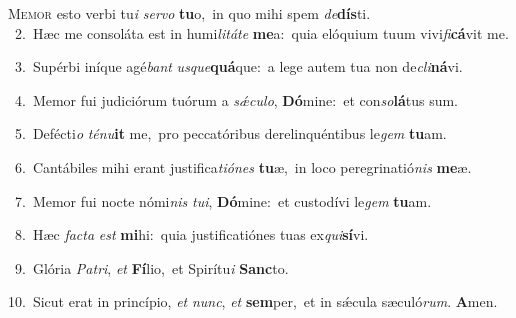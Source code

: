 \lettrine{\initial\textcolor{\initialcolor}{M}}{emor} esto verbi tu\textit{i} \textit{ser}\-\textit{vo} \textbf{tu}\-o,~\star in quo mihi spem \textit{de}\-\textbf{dís}ti.\\
{\numbfont\textcolor{\numbcolor}{~2.}}~Hæc me consoláta est in humi\-\textit{li}\-\textit{tá}\textit{te} \textbf{me}\-a:~\star quia elóquium tuum vivi\-\textit{fi}\-\textbf{cá}vit me.\par
{\numbfont\textcolor{\numbcolor}{~3.}}~Supérbi iníque agé\textit{bant} \textit{us}\-\textit{que}\textbf{quá}que:~\star a lege autem tua non de\-\textit{cli}\-\textbf{ná}vi.\par
{\numbfont\textcolor{\numbcolor}{~4.}}~Memor fui judiciórum tuórum a \textit{sǽ}\-\textit{cu}\textit{lo}, \textbf{Dó}\-mine:~\star et con\-\textit{so}\-\textbf{lá}tus sum.\par
{\numbfont\textcolor{\numbcolor}{~5.}}~Defécti\textit{o} \textit{té}\-\textit{nu}\textbf{it} me,~\star pro peccatóribus derelinquéntibus le\textit{gem} \textbf{tu}\-am.\par
{\numbfont\textcolor{\numbcolor}{~6.}}~Cantábiles mihi erant justifica\-\textit{ti}\-\textit{ó}\textit{nes} \textbf{tu}\-æ,~\star in loco peregrinatió\textit{nis} \textbf{me}\-æ.\par
{\numbfont\textcolor{\numbcolor}{~7.}}~Memor fui nocte nómi\textit{nis} \textit{tu}\-\textit{i}, \textbf{Dó}\-mine:~\star et custodívi le\textit{gem} \textbf{tu}\-am.\par
{\numbfont\textcolor{\numbcolor}{~8.}}~Hæc \textit{fac}\-\textit{ta} \textit{est} \textbf{mi}\-hi:~\star quia justificatiónes tuas ex\-\textit{qui}\-\textbf{sí}vi.\par
{\numbfont\textcolor{\numbcolor}{~9.}}~Glória \textit{Pa}\-\textit{tri}, \textit{et} \textbf{Fí}\-lio,~\star et Spirítu\textit{i} \textbf{Sanc}\-to.\par
{\numbfont\textcolor{\numbcolor}{10.}}~Sicut erat in princípio, \textit{et} \textit{nunc}\-, \textit{et} \textbf{sem}\-per,~\star et in sǽcula sæculó\-\textit{rum}\-. \textbf{A}\-men.\par
